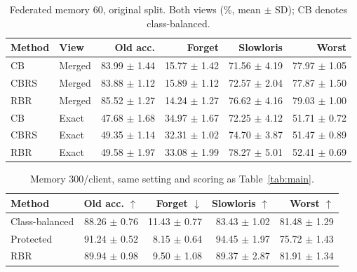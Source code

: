 \documentclass[10pt]{article}
\begin{document}
\begin{table}[!ht]
\centering
\caption{Federated memory 60, original split. Both views (\%, mean $\pm$ SD); CB denotes class-balanced.}
\label{tab:type}
\footnotesize
\setlength{\tabcolsep}{1.5pt}
\begin{tabular}{llrrrr}
\toprule
Method & View & Old acc. & Forget & Slowloris & Worst\\
\midrule
CB & Merged & 83.99 $\pm$ 1.44 & 15.77 $\pm$ 1.42 & 71.56 $\pm$ 4.19 & 77.97 $\pm$ 1.05\\
CBRS & Merged & 83.88 $\pm$ 1.12 & 15.89 $\pm$ 1.12 & 72.57 $\pm$ 2.04 & 77.87 $\pm$ 1.50\\
RBR & Merged & 85.52 $\pm$ 1.27 & 14.24 $\pm$ 1.27 & 76.62 $\pm$ 4.16 & 79.03 $\pm$ 1.00\\
CB & Exact & 47.68 $\pm$ 1.68 & 34.97 $\pm$ 1.67 & 72.25 $\pm$ 4.12 & 51.71 $\pm$ 0.72\\
CBRS & Exact & 49.35 $\pm$ 1.14 & 32.31 $\pm$ 1.02 & 74.70 $\pm$ 3.87 & 51.47 $\pm$ 0.89\\
RBR & Exact & 49.58 $\pm$ 1.97 & 33.08 $\pm$ 1.99 & 78.27 $\pm$ 5.01 & 52.41 $\pm$ 0.69\\
\bottomrule
\end{tabular}
\end{table}

\begin{table}[!ht]
\centering
\caption{Memory 300/client, same setting and scoring as Table~\ref{tab:main}.}
\label{tab:capacity}
\footnotesize
\setlength{\tabcolsep}{2.5pt}
\begin{tabular}{lrrrr}
\toprule
Method & Old acc. $\uparrow$ & Forget $\downarrow$ & Slowloris $\uparrow$ & Worst $\uparrow$\\
\midrule
Class-balanced & 88.26 $\pm$ 0.76 & 11.43 $\pm$ 0.77 & 83.43 $\pm$ 1.02 & 81.48 $\pm$ 1.29\\
Protected & 91.24 $\pm$ 0.52 & 8.15 $\pm$ 0.64 & 94.45 $\pm$ 1.97 & 75.72 $\pm$ 1.43\\
RBR & 89.94 $\pm$ 0.98 & 9.50 $\pm$ 1.08 & 89.37 $\pm$ 2.87 & 81.91 $\pm$ 1.34\\
\bottomrule
\end{tabular}
\end{table}
\end{document}
